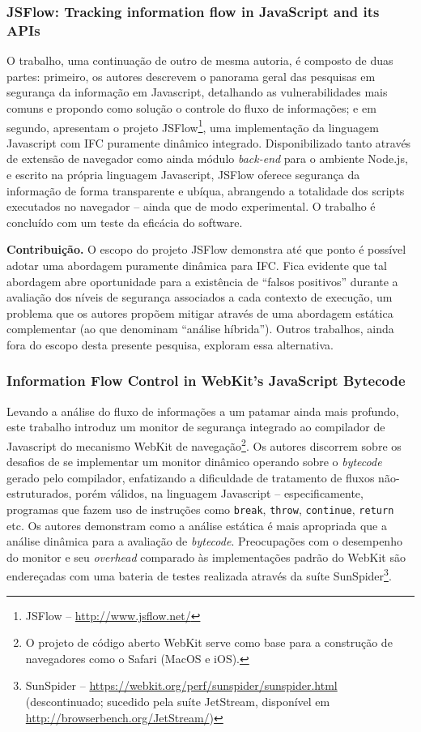\subsubsection{JSFlow: Tracking information flow in JavaScript and its APIs \cite{Hedin2014}}
O trabalho, uma continuação de outro de mesma autoria\cite{Hedin2012}, é composto de duas partes: primeiro, os autores descrevem o panorama geral das pesquisas em segurança da informação em Javascript, detalhando as vulnerabilidades mais comuns e propondo como solução o controle do fluxo de informações; e em segundo, apresentam o projeto JSFlow\footnote{JSFlow -- \url{http://www.jsflow.net/}}, uma implementação da linguagem Javascript com IFC puramente dinâmico integrado. Disponibilizado tanto através de extensão de navegador como ainda módulo \textit{back-end} para o ambiente Node.js, e escrito na própria linguagem Javascript, JSFlow oferece segurança da informação de forma transparente e ubíqua, abrangendo a totalidade dos scripts executados no navegador -- ainda que de modo experimental. O trabalho é concluído com um teste da eficácia do software.

\textbf{Contribuição.} O escopo do projeto JSFlow demonstra até que ponto é possível adotar uma abordagem puramente dinâmica para IFC. Fica evidente que tal abordagem abre oportunidade para a existência de ``falsos positivos'' durante a avaliação dos níveis de segurança associados a cada contexto de execução, um problema que os autores propõem mitigar através de uma abordagem estática complementar (ao que denominam ``análise híbrida''). Outros trabalhos, ainda fora do escopo desta presente pesquisa, exploram essa alternativa.


\subsubsection{Information Flow Control in WebKit's JavaScript Bytecode \cite{Bichhawat2014}}
Levando a análise do fluxo de informações a um patamar ainda mais profundo, este trabalho introduz um monitor de segurança integrado ao compilador de Javascript do mecanismo WebKit de navegação\footnote{O projeto de código aberto WebKit serve como base para a construção de navegadores como o Safari (MacOS e iOS).}. Os autores discorrem sobre os desafios de se implementar um monitor dinâmico operando sobre o \textit{bytecode} gerado pelo compilador, enfatizando a dificuldade de tratamento de fluxos não-estruturados, porém válidos, na linguagem Javascript -- especificamente, programas que fazem uso de instruções como \texttt{break}, \texttt{throw}, \texttt{continue}, \texttt{return} etc. Os autores demonstram como a análise estática é mais apropriada que a análise dinâmica para a avaliação de \textit{bytecode}. Preocupações com o desempenho do monitor e seu \textit{overhead} comparado às implementações padrão do WebKit são endereçadas com uma bateria de testes realizada através da suíte SunSpider\footnote{SunSpider -- \url{https://webkit.org/perf/sunspider/sunspider.html} (descontinuado; sucedido pela suíte JetStream, disponível em \url{http://browserbench.org/JetStream/})}.

